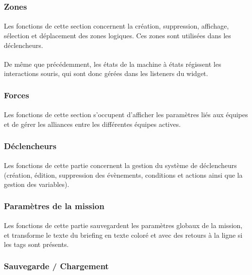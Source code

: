 \documentclass[a4paper]{article}
\begin{document}
\subsubsection{Zones}
\paragraph{}
Les fonctions de cette section concernent la création, suppression, affichage, sélection et déplacement des zones logiques. Ces zones sont utilisées dans les déclencheurs.
\paragraph{}
De même que précédemment, les états de la machine à états régissent les interactions souris, qui sont donc gérées dans les listeners du widget.
\subsubsection{Forces}
\paragraph{}
Les fonctions de cette section s'occupent d'afficher les paramètres liés aux équipes et de gérer les alliances entre les différentes équipes actives.
\subsubsection{Déclencheurs}
\paragraph{}
Les fonctions de cette partie concernent la gestion du système de déclencheurs (création, édition, suppression des évènements, conditions et actions ainsi que la gestion des variables).
\subsubsection{Paramètres de la mission}
\paragraph{}
Les fonctions de cette partie sauvegardent les paramètres globaux de la mission, et transforme le texte du briefing en texte coloré et avec des retours à la ligne si les tags sont présents.
\subsubsection{Sauvegarde / Chargement}
\end{document}
